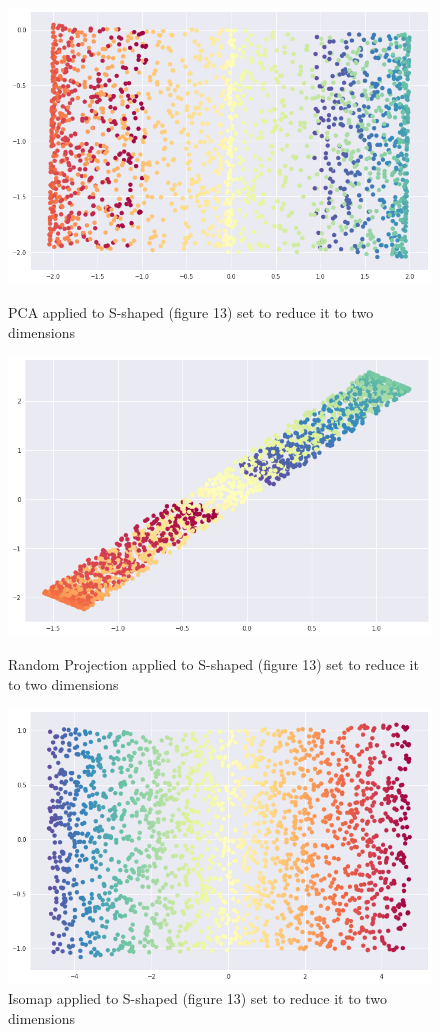 \documentclass[a4paper]{article}
\begin{document}
\begin{figure}[H]
\centering
\includegraphics[scale = 0.32]{pca_part3.png}
\caption{\label{fig:pca_part3}PCA applied to S-shaped (figure 13) set to reduce it to two dimensions}
\includegraphics[scale = 0.32]{random_projection_part3.png}
\caption{\label{fig:random_projection_part3}Random Projection applied to S-shaped (figure 13) set to reduce it to two dimensions}

\includegraphics[scale = 0.32]{isomap_part3.png}
\caption{\label{fig:isomap_part3}Isomap applied to S-shaped (figure 13) set to reduce it to two dimensions}
\end{figure}
\end{document}

